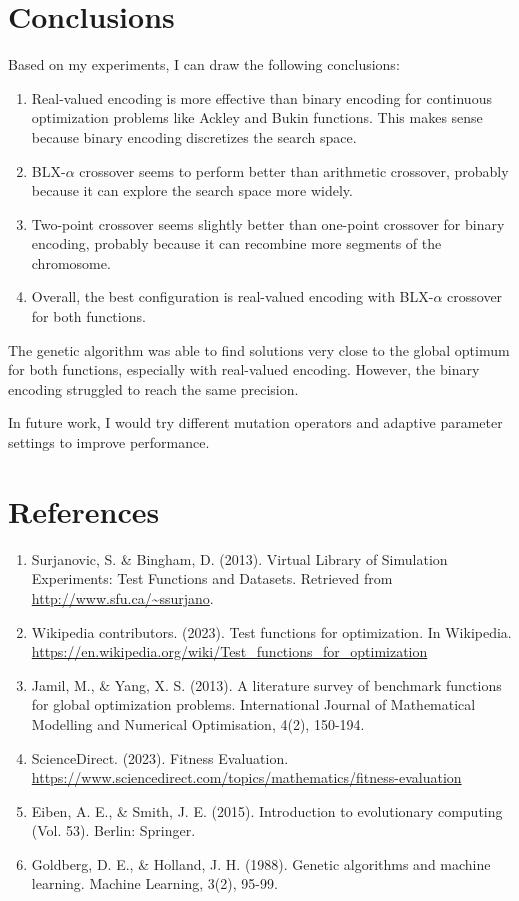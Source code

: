 \documentclass{article}
\begin{document}
\section{Conclusions}
Based on my experiments, I can draw the following conclusions:

\begin{enumerate}
\item Real-valued encoding is more effective than binary encoding for continuous optimization problems like Ackley and Bukin functions. This makes sense because binary encoding discretizes the search space.
\item BLX-$\alpha$ crossover seems to perform better than arithmetic crossover, probably because it can explore the search space more widely.
\item Two-point crossover seems slightly better than one-point crossover for binary encoding, probably because it can recombine more segments of the chromosome.
\item Overall, the best configuration is real-valued encoding with BLX-$\alpha$ crossover for both functions.
\end{enumerate}

The genetic algorithm was able to find solutions very close to the global optimum for both functions, especially with real-valued encoding. However, the binary encoding struggled to reach the same precision.

In future work, I would try different mutation operators and adaptive parameter settings to improve performance.

\section{References}
\begin{enumerate}
\item Surjanovic, S. \& Bingham, D. (2013). Virtual Library of Simulation Experiments: Test Functions and Datasets. Retrieved from \url{http://www.sfu.ca/~ssurjano}.
\item Wikipedia contributors. (2023). Test functions for optimization. In Wikipedia. \url{https://en.wikipedia.org/wiki/Test_functions_for_optimization}
\item Jamil, M., \& Yang, X. S. (2013). A literature survey of benchmark functions for global optimization problems. International Journal of Mathematical Modelling and Numerical Optimisation, 4(2), 150-194.
\item ScienceDirect. (2023). Fitness Evaluation. \url{https://www.sciencedirect.com/topics/mathematics/fitness-evaluation}
\item Eiben, A. E., \& Smith, J. E. (2015). Introduction to evolutionary computing (Vol. 53). Berlin: Springer.
\item Goldberg, D. E., \& Holland, J. H. (1988). Genetic algorithms and machine learning. Machine Learning, 3(2), 95-99.
\end{enumerate}
\end{document}
